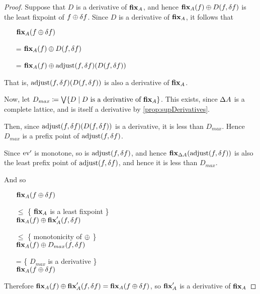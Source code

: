 \begin{proof}
  Suppose that $D$ is a derivative of $\textbf{fix}_A$, and hence $\textbf{fix}_A(f) \oplus D(f,
  \delta f)$ is the least fixpoint of $f \oplus \delta f$. 
  Since $D$ is a derivative of $\textbf{fix}_A$, it follows that 
  \begin{itemize}
    \item[ ]$\textbf{fix}_A (f \oplus \delta f)$
    \item[=]$\textbf{fix}_A(f) \oplus D(f, \delta f)$
    \item[=]$\textbf{fix}_A(f) \oplus \operatorname{adjust}(f, \delta f)(D(f, \delta f))$
  \end{itemize}

  That is, $\operatorname{adjust}(f, \delta f)(D(f, \delta f))$ is also a
  derivative of $\textbf{fix}_A$.

  Now, let $D_{max} \coloneqq \bigvee \{D \mid D \textrm{ is a derivative of }
  \textbf{fix}_A \}$. This exists, since $\Delta A$ is a complete lattice, and
  is itself a derivative by \ref{prop:supDerivatives}.

  Then, since 
  $\operatorname{adjust}(f, \delta f)(D(f, \delta f))$ is a
  derivative, it is less than $D_{max}$. Hence $D_{max}$ is a prefix point of
  $\operatorname{adjust}(f, \delta f)$.

  Since $\operatorname{ev}'$ is monotone, so is $\operatorname{adjust}(f, \delta f)$, and
  hence $\textbf{fix}_{\Delta A}(\operatorname{adjust}(f, \delta f))$ is also the
  least prefix point of $\operatorname{adjust}(f, \delta f)$, and hence it is less
  than $D_{max}$.

  And so 
  \begin{itemize}
    \item[ ]
      $\textbf{fix}_A(f \oplus \delta f)$
    \item[$\leq$]\{ $\textbf{fix}_A$ is a least fixpoint \}\\
      $\textbf{fix}_A(f) \oplus \textbf{fix}_A'(f, \delta f)$
    \item[$\leq$]\{ monotonicity of $\oplus$ \}\\
      $\textbf{fix}_A(f) \oplus D_{max}(f, \delta f)$
    \item[=]\{ $D_{max}$ is a derivative \}\\
      $\textbf{fix}_A(f \oplus \delta f)$
  \end{itemize}

  Therefore $\textbf{fix}_A(f) \oplus \textbf{fix}_A'(f, \delta f) =
  \textbf{fix}_A(f \oplus \delta f)$, so $\textbf{fix}_A'$ is a derivative of $\textbf{fix}_A$
\end{proof}

